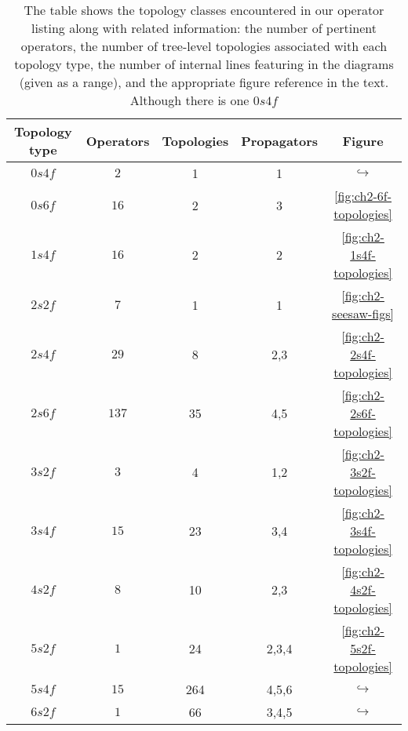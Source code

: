 \begin{table}[t]
  \centering
  \begin{tabular}{ccccc}
    \toprule
    Topology type & Operators & Topologies & Propagators & Figure \\
    \midrule
    $0s4f$        & $2$       & 1          & 1           & $\hookrightarrow$         \\
    $0s6f$        & $16$      & 2          & 3           & \ref{fig:ch2-6f-topologies}   \\
    $1s4f$        & $16$      & 2          & 2           & \ref{fig:ch2-1s4f-topologies} \\
    $2s2f$        & $7$       & 1          & 1           & \ref{fig:ch2-seesaw-figs}     \\
    $2s4f$        & $29$      & 8          & 2,3         & \ref{fig:ch2-2s4f-topologies} \\
    $2s6f$        & $137$     & 35         & 4,5         & \ref{fig:ch2-2s6f-topologies} \\
    $3s2f$        & $3$       & 4          & 1,2         & \ref{fig:ch2-3s2f-topologies} \\
    $3s4f$        & $15$      & 23         & 3,4         & \ref{fig:ch2-3s4f-topologies} \\
    $4s2f$        & $8$       & 10         & 2,3         & \ref{fig:ch2-4s2f-topologies} \\
    $5s2f$        & $1$       & 24         & 2,3,4       & \ref{fig:ch2-5s2f-topologies} \\
    $5s4f$        & $15$      & 264        & 4,5,6       & $\hookrightarrow$         \\
    $6s2f$        & $1$       & 66         & 3,4,5       & $\hookrightarrow$         \\
    \bottomrule
  \end{tabular}
  \caption[The table shows the topology classes encountered in our operator
    listing along with related information: the number of pertinent operators,
    the number of tree-level topologies associated with each topology type, the
    number of internal lines featuring in the diagrams (given as a range), and
    the appropriate figure reference in the text.]{The table shows the topology classes encountered in our operator
    listing along with related information: the number of pertinent operators,
    the number of tree-level topologies associated with each topology type, the
    number of internal lines featuring in the diagrams (given as a range), and
    the appropriate figure reference in the text. Although there is one $0s4f$
}
\end{table}
